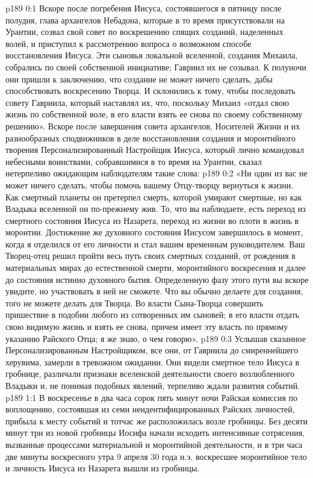 \author{Комиссия срединников}
\vs p189 0:1 Вскоре после погребения Иисуса, состоявшегося в пятницу после полудня, глава архангелов Небадона, которые в то время присутствовали на Урантии, созвал свой совет по воскрешению спящих созданий, наделенных волей, и приступил к рассмотрению вопроса о возможном способе восстановления Иисуса. Эти сыновья локальной вселенной, создания Михаила, собрались по своей собственной инициативе; Гавриил их не созывал. К полуночи они пришли к заключению, что создание не может ничего сделать, дабы способствовать воскресению Творца. И склонились к тому, чтобы последовать совету Гавриила, который наставлял их, что, поскольку Михаил «отдал свою жизнь по собственной воле, в его власти взять ее снова по своему собственному решению». Вскоре после завершения совета архангелов, Носителей Жизни и их разнообразных сподвижников в деле восстановления создания и моронтийного творения Персонализированный Настройщик Иисуса, который лично командовал небесными воинствами, собравшимися в то время на Урантии, сказал нетерпеливо ожидающим наблюдателям такие слова:
\vs p189 0:2 «Ни один из вас не может ничего сделать, чтобы помочь вашему Отцу\hyp{}творцу вернуться к жизни. Как смертный планеты он претерпел смерть, которой умирают смертные, но как Владыка вселенной он по\hyp{}прежнему жив. То, что вы наблюдаете, есть переход из смертного состояния Иисуса из Назарета, переход из жизни во плоти в жизнь в моронтии. Достижение же духовного состояния Иисусом завершилось в момент, когда я отделился от его личности и стал вашим временным руководителем. Ваш Творец\hyp{}отец решил пройти весь путь своих смертных созданий, от рождения в материальных мирах до естественной смерти, моронтийного воскресения и далее до состояния истинно духовного бытия. Определенную фазу этого пути вы вскоре увидите, но участвовать в ней не сможете. Что вы обычно делаете для создания, того не можете делать для Творца. Во власти Сына\hyp{}Творца совершить пришествие в подобии любого из сотворенных им сыновей; в его власти отдать свою видимую жизнь и взять ее снова, причем имеет эту власть по прямому указанию Райского Отца; я же знаю, о чем говорю».
\vs p189 0:3 Услышав сказанное Персонализированным Настройщиком, все они, от Гавриила до смиреннейшего херувима, замерли в тревожном ожидании. Они видели смертное тело Иисуса в гробнице, различали признаки вселенской деятельности своего возлюбленного Владыки и, не понимая подобных явлений, терпеливо ждали развития событий.
\vs p189 1:1 В воскресенье в два часа сорок пять минут ночи Райская комиссия по воплощению, состоявшая из семи неидентифицированных Райских личностей, прибыла к месту событий и тотчас же расположилась возле гробницы. Без десяти минут три из новой гробницы Иосифа начали исходить интенсивные сотрясения, вызванные процессами материальной и моронтийной деятельности, и в три часа две минуты воскресного утра 9 апреля 30 года н.э. воскресшее моронтийное тело и личность Иисуса из Назарета вышли из гробницы.
